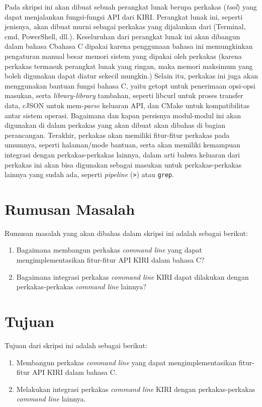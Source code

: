 Pada skripsi ini akan dibuat sebuah perangkat lunak berupa perkakas \cl\xspace (\cl\xspace\textit{tool}) yang dapat menjalankan fungsi-fungsi API dari KIRI. Perangkat lunak ini, seperti jenisnya, akan dibuat murni sebagai perkakas yang dijalankan dari \cl (Terminal, cmd, PowerShell, dll.). Keseluruhan dari perangkat lunak ini akan dibangun dalam bahasa C\textemdash bahasa C dipakai karena penggunaan bahasa ini memungkinkan pengaturan manual besar memori sistem yang dipakai oleh perkakas \cite{raymond:2003:artofunixprogramming} (karena perkakas termasuk perangkat lunak yang ringan, maka memori maksimum yang boleh digunakan dapat diatur sekecil mungkin.) Selain itu, perkakas ini juga akan menggunakan bantuan fungsi bahasa C, yaitu getopt untuk penerimaan opsi-opsi masukan, serta \textit{library-library} tambahan, seperti libcurl untuk proses transfer data, cJSON untuk mem-\textit{parse} keluaran API, dan CMake untuk kompatibilitas antar sistem operasi. Bagaimana dan kapan persisnya modul-modul ini akan digunakan di dalam perkakas yang akan dibuat akan dibahas di bagian perancangan. Terakhir, perkakas akan memiliki fitur-fitur perkakas \cl\xspace pada umumnya, seperti halaman/mode bantuan, serta akan memiliki kemampuan integrasi dengan perkakas-perkakas \cl\xspace lainnya, dalam arti bahwa keluaran dari perkakas ini akan bisa digunakan sebagai masukan untuk perkakas-perkakas \cl\xspace lainnya yang sudah ada, seperti \textit{pipeline} (\verb|>|) atau \verb|grep|.

\section{Rumusan Masalah}
\label{sec:rumusan}
Rumusan masalah yang akan dibahas dalam skripsi ini adalah sebagai berikut:
\begin{enumerate}
	\item Bagaimana membangun perkakas \textit{command line} yang dapat mengimplementasikan fitur-fitur API KIRI dalam bahasa C?
	\item Bagaimana integrasi perkakas \textit{command line} KIRI dapat dilakukan dengan perkakas-perkakas \textit{command line} lainnya?
\end{enumerate}

\section{Tujuan}
\label{sec:tujuan}
Tujuan dari skripsi ini adalah sebagai berikut:
\begin{enumerate}
	\item Membangun perkakas \textit{command line} yang dapat mengimplementasikan fitur-fitur API KIRI dalam bahasa C.
	\item Melakukan integrasi perkakas \textit{command line} KIRI dengan perkakas-perkakas \textit{command line} lainnya.
\end{enumerate}
\vspace{-0.5em} %
